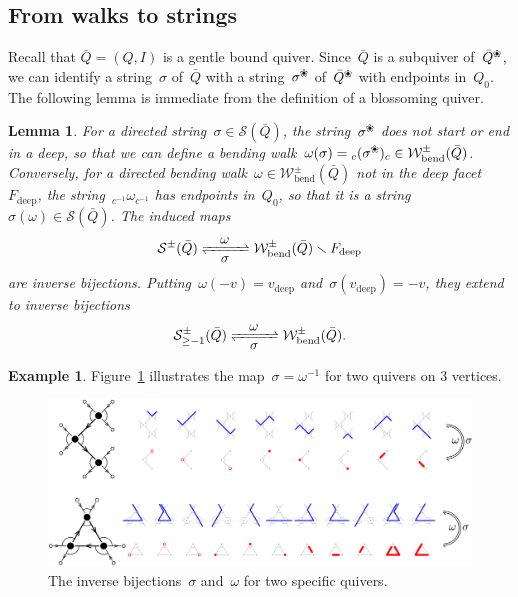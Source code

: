 \documentclass{amsart}
\newtheorem{lemma}[theorem]{Lemma}
\theoremstyle{definition}
\newtheorem{example}[theorem]{Example}
\newcommand{\ssm}{\smallsetminus} %
\newcommand{\fref}[1]{Figure~\ref{#1}} %
\newcommand{\blossom}{^\text{\ding{96}}} %
\newcommand{\strings}{\mathcal{S}} %
\newcommand{\bendingWalks}{\mathcal{W}_\mathrm{bend}} %
\newcommand{\deep}{\mathrm{deep}} %
\begin{document}
\subsection{From walks to strings}
\label{subsec:walks2strings}

Recall that $\bar Q = (Q,I)$ is a gentle bound quiver.
Since~$\bar Q$ is a subquiver of~$\bar Q\blossom$, we can identify a string~$\sigma$ of~$\bar Q$ with a string~$\sigma\blossom$ of~$\bar Q\blossom$ with endpoints in~$Q_0$.
The following lemma is immediate from the definition of a blossoming quiver.

\begin{lemma}
\label{lem:bijections-STTC-NKC}
For a directed string~$\sigma \in \strings(\bar Q)$, the string~$\sigma\blossom$ does not start or end in a deep, so that we can define a bending walk~$\omega(\sigma) = \phantom{}_c (\sigma\blossom) \phantom{}_c \in \bendingWalks^\pm(\bar Q)$.
Conversely, for a directed bending walk~$\omega \in \bendingWalks^\pm(\bar Q)$ not in the deep facet~$F_\deep$, the string~$\phantom{}_{c^{-1}} \omega \phantom{}_{c^{-1}}$ has endpoints in~$Q_0$, so that it is a string~$\sigma(\omega) \in \strings(\bar Q)$.
The induced maps
\[
\strings^\pm(\bar Q) \xrightleftharpoons[\quad\mbox{$\sigma$}\;\quad]{\mbox{$\omega$}} \bendingWalks^\pm(\bar Q) \ssm F_\deep
\]
are inverse bijections.
Putting~$\omega(-v) = v_\deep$ and~$\sigma(v_\deep) = -v$, they extend to inverse bijections
\[
\strings_{\ge-1}^\pm(\bar Q) \xrightleftharpoons[\quad\mbox{$\sigma$}\;\quad]{\mbox{$\omega$}} \bendingWalks^\pm(\bar Q).
\]
\end{lemma}

\begin{example}
\label{exm:exmBijectionStringsWalks1}
\fref{fig:exmBijectionStringsWalks1} illustrates the map~$\sigma = \omega^{-1}$ for two quivers on $3$ vertices.

\begin{figure}[t]
	\capstart
	\centerline{\includegraphics[scale=.4]{exmBijectionStringsWalks1}}
	\caption{The inverse bijections~$\sigma$ and~$\omega$ for two specific quivers.}
	\label{fig:exmBijectionStringsWalks1}
\end{figure}
\end{example}
\end{document}
